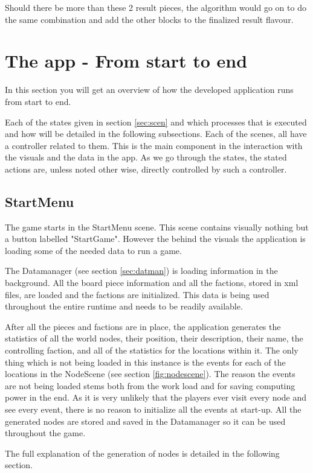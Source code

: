 Should there be more than these 2 result pieces, the algorithm would go on to do the same combination and add the other blocks to the finalized result flavour.

\section{The app - From start to end}
In this section you will get an overview of how the developed application runs from start to end. 

Each of the states given in section \ref{sec:scen} and which processes that is executed and how will be detailed in the following subsections.
Each of the scenes, all have a controller related to them. This is the main component in the interaction with the visuals and the data in the app. As we go through the states, the stated actions are, unless noted other wise, directly controlled by such a controller.

\subsection{StartMenu}
The game starts in the StartMenu scene. This scene contains visually nothing but a button labelled "StartGame". 
However the behind the visuals the application is loading some of the needed data to run a game.

The Datamanager (see section \ref{sec:datman}) is loading information in the background. 
All the board piece information and all the factions, stored in xml files, are loaded and the factions are initialized. 
This data is being used throughout the entire runtime and needs to be readily available.

After all the pieces and factions are in place, the application generates the statistics of all the world nodes, their position, their description, their name, the controlling faction, and all of the statistics for the locations within it.
The only thing which is not being loaded in this instance is the events for each of the locations in the NodeScene (see section \ref{fig:nodescene}). The reason the events are not being loaded stems both from the work load and for saving computing power in the end. As it is very unlikely that the players ever visit every node and see every event, there is no reason to initialize all the events at start-up. 
All the generated nodes are stored and saved in the Datamanager so it can be used throughout the game.

The full explanation of the generation of nodes is detailed in the following section.

